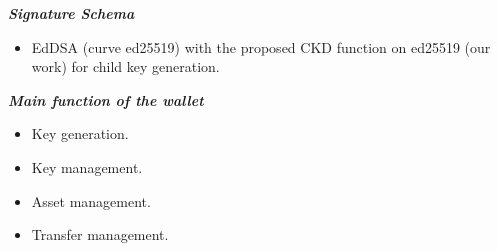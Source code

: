 {\textit {\textbf{Signature Schema}}}
\begin{itemize}
    \item EdDSA (curve ed25519) with the proposed CKD function on ed25519 (our work) for child key generation.
\end{itemize}

{\textit {\textbf{Main function of the wallet}}}
\begin{itemize}
    \item Key generation.
    \item Key management.
    \item Asset management.
    \item Transfer management.
\end{itemize}
